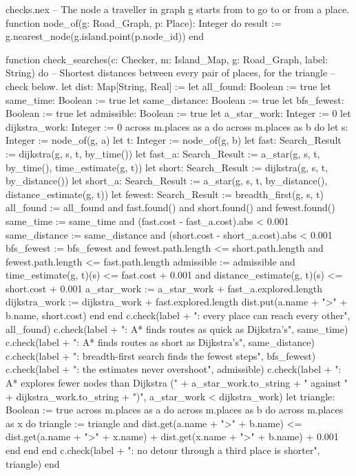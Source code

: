 \begin{append}{checks.nex}
-- The node a traveller in graph g starts from to go to or from a place.
function node_of(g: Road_Graph, p: Place): Integer do
  result := g.nearest_node(g.island.point(p.node_id))
end

function check_searches(c: Checker, m: Island_Map, g: Road_Graph, label: String) do
  -- Shortest distances between every pair of places, for the triangle
  -- check below.
  let dist: Map[String, Real] := {}
  let all_found: Boolean := true
  let same_time: Boolean := true
  let same_distance: Boolean := true
  let bfs_fewest: Boolean := true
  let admissible: Boolean := true
  let a_star_work: Integer := 0
  let dijkstra_work: Integer := 0
  across m.places as a do
    across m.places as b do
      let s: Integer := node_of(g, a)
      let t: Integer := node_of(g, b)
      let fast: Search_Result := dijkstra(g, s, t, by_time())
      let fast_a: Search_Result := a_star(g, s, t, by_time(), time_estimate(g, t))
      let short: Search_Result := dijkstra(g, s, t, by_distance())
      let short_a: Search_Result := a_star(g, s, t, by_distance(), distance_estimate(g, t))
      let fewest: Search_Result := breadth_first(g, s, t)
      all_found := all_found and fast.found() and short.found() and fewest.found()
      same_time := same_time and (fast.cost - fast_a.cost).abs < 0.001
      same_distance := same_distance and (short.cost - short_a.cost).abs < 0.001
      bfs_fewest := bfs_fewest and fewest.path.length <= short.path.length
        and fewest.path.length <= fast.path.length
      admissible := admissible and time_estimate(g, t)(s) <= fast.cost + 0.001
        and distance_estimate(g, t)(s) <= short.cost + 0.001
      a_star_work := a_star_work + fast_a.explored.length
      dijkstra_work := dijkstra_work + fast.explored.length
      dist.put(a.name + ">" + b.name, short.cost)
    end
  end
  c.check(label + ": every place can reach every other", all_found)
  c.check(label + ": A* finds routes as quick as Dijkstra's", same_time)
  c.check(label + ": A* finds routes as short as Dijkstra's", same_distance)
  c.check(label + ": breadth-first search finds the fewest steps", bfs_fewest)
  c.check(label + ": the estimates never overshoot", admissible)
  c.check(label + ": A* explores fewer nodes than Dijkstra ("
    + a_star_work.to_string + " against " + dijkstra_work.to_string + ")",
    a_star_work < dijkstra_work)
  let triangle: Boolean := true
  across m.places as a do
    across m.places as b do
      across m.places as x do
        triangle := triangle and dist.get(a.name + ">" + b.name)
          <= dist.get(a.name + ">" + x.name) + dist.get(x.name + ">" + b.name) + 0.001
      end
    end
  end
  c.check(label + ": no detour through a third place is shorter", triangle)
end
\end{append}

